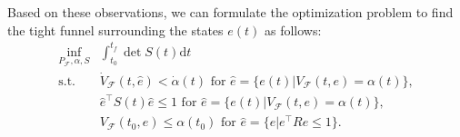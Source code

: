 \documentclass[letterpaper, 10 pt, conference]{ieeeconf}  %
\begin{document}
Based on these observations, we can formulate the optimization problem to find the tight funnel surrounding the states $e(t)$ as follows:
\begin{equation}
\begin{array}{rl}
\displaystyle{\inf_{P_\mathcal{F},\alpha,S}} & \int_{t_0}^{t_f} \det{S(t)}\text{d}t \label{eq:optim1} \\
\displaystyle{\text{s.t.}}& \dot{V}_\mathcal{F}(t,\hat{e}) < \dot{\alpha}(t)\text{ for }\hat{e} = \{e(t)|V_\mathcal{F}(t,e) = \alpha(t)\}, \nonumber \\
& \hat{e}^\intercal S(t) \hat{e} \leq 1\text{ for }\hat{e} = \{e(t)|V_\mathcal{F}(t,e) = \alpha(t)\}, \nonumber \\
& V_\mathcal{F}(t_0,\hat{e}) \leq \alpha(t_0)\text{ for }\hat{e} = \{e|e^\intercal R e \leq 1\}. \nonumber
\end{array}
\end{equation}
\end{document}
